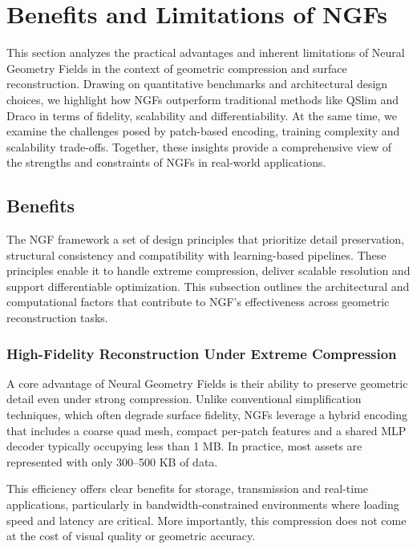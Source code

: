 \section{Benefits and Limitations of NGFs}\label{Sec:Evaluation}

This section analyzes the practical advantages and inherent limitations of Neural Geometry Fields in the context of geometric compression and surface reconstruction. 
Drawing on quantitative benchmarks and architectural design choices, we highlight how NGFs outperform traditional methods like QSlim and Draco in terms of fidelity, scalability and differentiability. 
At the same time, we examine the challenges posed by patch-based encoding, training complexity and scalability trade-offs. 
Together, these insights provide a comprehensive view of the strengths and constraints of NGFs in real-world applications.


\subsection{Benefits}

The NGF framework a set of design principles that prioritize detail preservation, structural consistency and compatibility with learning-based pipelines. 
These principles enable it to handle extreme compression, deliver scalable resolution and support differentiable optimization. 
This subsection outlines the architectural and computational factors that contribute to NGF's effectiveness across geometric reconstruction tasks.

\subsubsection{High-Fidelity Reconstruction Under Extreme Compression}

A core advantage of Neural Geometry Fields is their ability to preserve geometric detail even under strong compression. 
Unlike conventional simplification techniques, which often degrade surface fidelity, NGFs leverage a hybrid encoding that includes a coarse quad mesh, compact per-patch features and a shared MLP decoder typically occupying less than 1 MB. 
In practice, most assets are represented with only 300--500 KB of data. 

This efficiency offers clear benefits for storage, transmission and real-time applications, particularly in bandwidth-constrained environments where loading speed and latency are critical. 
More importantly, this compression does not come at the cost of visual quality or geometric accuracy. 

